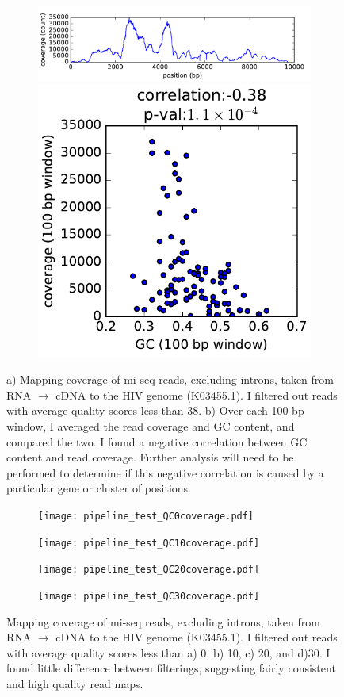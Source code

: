 \documentclass[article]{revtex4}
\begin{document}
\graphicspath{{"./"}}
\begin{figure}
\begin{subfigure}{1\textwidth}
\includegraphics[width=0.99\linewidth]{coverage.pdf}
\caption{}
\includegraphics[width=0.4\linewidth]{correlation.pdf}
\caption{}
\end{subfigure}
\caption{a) Mapping coverage of mi-seq reads, excluding introns, taken from RNA $\rightarrow$ cDNA to the HIV genome (K03455.1). I filtered out reads with average quality scores less than 38. b) Over each 100 bp window, I averaged the read coverage and GC content, and compared the two. I found a negative correlation between GC content and read coverage. Further analysis will need to be performed to determine if this negative correlation is caused by a particular gene or cluster of positions. }\label{fig:phred38}
\end{figure}

\graphicspath{{"./STAR_out/"}}
\begin{figure}
\begin{subfigure}{1\textwidth}
\texttt{[image: pipeline\_test\_QC0coverage.pdf]}
\caption{}
\texttt{[image: pipeline\_test\_QC10coverage.pdf]}
\caption{}
\texttt{[image: pipeline\_test\_QC20coverage.pdf]}
\caption{}
\texttt{[image: pipeline\_test\_QC30coverage.pdf]}
\caption{}
\end{subfigure}
\caption{ Mapping coverage of mi-seq reads, excluding introns, taken from RNA $\rightarrow$ cDNA to the HIV genome (K03455.1). I filtered out reads with average quality scores less than a) 0, b) 10, c) 20, and d)30. I found little difference between filterings, suggesting fairly consistent and high quality read maps. }\label{fig:coverage}
\end{figure}
\end{document}
